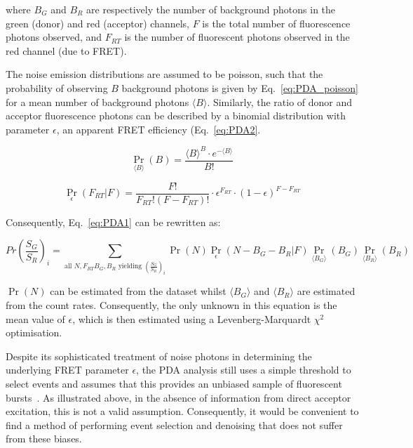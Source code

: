 where $B_G$ and $B_R$ are respectively the number of background photons in the green (donor) and red (acceptor) channels, $F$ is the total number of fluorescence photons observed, and $F_{RT}$ is the number of fluorescent photons observed in the red channel (due to FRET).

The noise emission distributions are assumed to be poisson, such that the probability of observing $B$ background photons is given by Eq.~\ref{eq:PDA_poisson} for a mean number of background photons $\langle B \rangle$. Similarly, the ratio of donor and acceptor fluorescence photons can be described by a binomial distribution with parameter $\epsilon$, an apparent FRET efficiency (Eq.~\ref{eq:PDA2}.

\begin{equation}
\Pr_{\langle B \rangle}(B)  = \frac{\langle B \rangle^B \cdot e^{-\langle B \rangle}}{B!}
\label{eq:PDA_poisson}
\end{equation}

\begin{equation}
\Pr_{\epsilon}(F_{RT}|F) = \frac{F!}{F_{RT}! (F - F_{RT})!} \cdot \epsilon^{F_{RT}} \cdot (1 - \epsilon)^{F - F_{RT}}
\label{eq:PDA2}
\end{equation}

Consequently, Eq.~\ref{eq:PDA1} can be rewritten as: 

\begin{equation}
Pr (\frac{S_G}{S_R})_i = \sum \limits_{\text{all $N, F_{RT} B_G, B_R$ yielding $(\frac{S_G}{S_R})_i$}} \Pr(N) \Pr_{\epsilon}(N - B_G - B_R| F) \Pr_{\langle B_G \rangle}(B_G) \Pr_{\langle B_R \rangle}(B_R)
\label{eq:PDA3}
\end{equation}

$\Pr(N)$ can be estimated from the dataset whilst $\langle B_G \rangle$ and $\langle B_R \rangle$ are estimated from the count rates. Consequently, the only unknown in this equation is the mean value of $\epsilon$, which is then estimated using a Levenberg-Marquardt $\chi^2$ optimisation.

Despite its sophisticated treatment of noise photons in determining the underlying FRET parameter $\epsilon$, the PDA analysis still uses a simple threshold to select events and assumes that this provides an unbiased sample of fluorescent bursts~\cite{kalinin2007, antonik2006}. As illustrated above, in the absence of information from direct acceptor excitation, this is not a valid assumption. Consequently, it would be convenient to find a method of performing event selection and denoising that does not suffer from these biases.  

